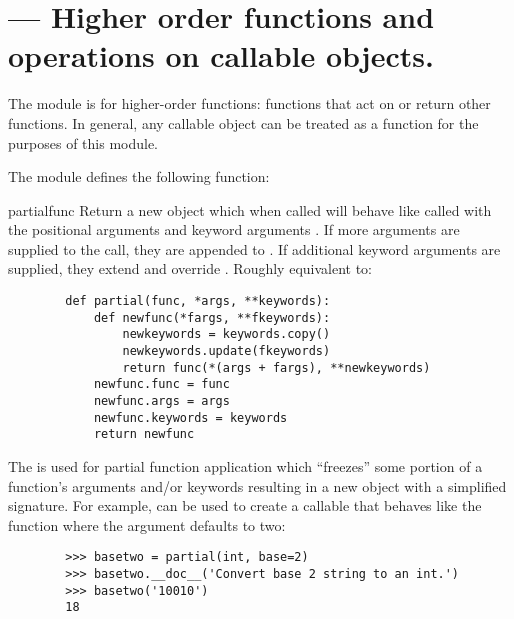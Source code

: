\section{ ---
         Higher order functions and operations on callable objects.}





The  module is for higher-order functions: functions
that act on or return other functions. In general, any callable object can
be treated as a function for the purposes of this module.


The  module defines the following function:

\begin{funcdesc}{partial}{func}
Return a new  object which when called will behave like
 called with the positional arguments  and keyword
arguments . If more arguments are supplied to the call, they
are appended to . If additional keyword arguments are supplied,
they extend and override . Roughly equivalent to:
  \begin{verbatim}
        def partial(func, *args, **keywords):
            def newfunc(*fargs, **fkeywords):
                newkeywords = keywords.copy()
                newkeywords.update(fkeywords)
                return func(*(args + fargs), **newkeywords)
            newfunc.func = func
            newfunc.args = args
            newfunc.keywords = keywords
            return newfunc
  \end{verbatim}

The  is used for partial function application which
``freezes'' some portion of a function's arguments and/or keywords
resulting in a new object with a simplified signature.  For example,
 can be used to create a callable that behaves like
the  function where the  argument defaults to
two:
  \begin{verbatim}
        >>> basetwo = partial(int, base=2)
        >>> basetwo.__doc__('Convert base 2 string to an int.')
        >>> basetwo('10010')
        18
  \end{verbatim}
\end{funcdesc}



